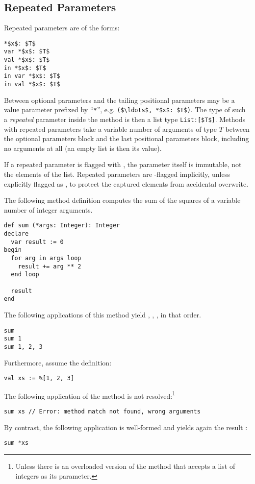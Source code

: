 \subsection{Repeated Parameters}
\label{sec:repeated-parameters}

Repeated parameters are of the forms:
\begin{lstlisting}
*$x$: $T$
var *$x$: $T$
val *$x$: $T$
in *$x$: $T$
in var *$x$: $T$
in val *$x$: $T$
\end{lstlisting}

Between optional parameters and the tailing positional parameters may be a value parameter prefixed by ``\lstinline!*!'', e.g. \lstinline!($\ldots$, *$x$: $T$)!. The type of such a {\em repeated} parameter inside the method is then a list type \lstinline!List:[$T$]!. Methods with repeated parameters take a variable number of arguments of type $T$ between the optional parameters block and the last positional parameters block, including no arguments at all (an empty list is then its value). 

If a repeated parameter is flagged with , the parameter itself is immutable, not the elements of the list. Repeated parameters are -flagged implicitly, unless explicitly flagged as , to protect the captured elements from accidental overwrite. 

\example The following method definition computes the sum of the squares of a variable number of integer arguments.
\begin{lstlisting}
def sum (*args: Integer): Integer
declare
  var result := 0
begin
  for arg in args loop
    result += arg ** 2
  end loop
  
  result
end
\end{lstlisting}
The following applications of this method yield , , , in that order.
\begin{lstlisting}
sum
sum 1
sum 1, 2, 3
\end{lstlisting}
Furthermore, assume the definition:
\begin{lstlisting}
val xs := %[1, 2, 3]
\end{lstlisting}
The following application of the method  is not resolved:\footnote{Unless there is an overloaded version of the method that accepts a list of integers as its parameter.}
\begin{lstlisting}
sum xs // Error: method match not found, wrong arguments
\end{lstlisting}
By contrast, the following application is well-formed and yields again the result :
\begin{lstlisting}
sum *xs
\end{lstlisting}

